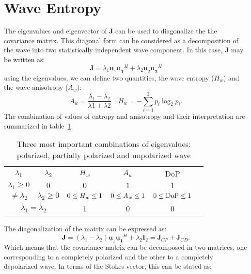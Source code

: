 \documentclass[11pt]{article}
\begin{document}
\section{Wave Entropy}
The eigenvalues and eigenvector of $\mathbf{J}$ can be used to diagonalize the the covariance matrix. This diagonal form can
be considered as a decomposition of the wave into two statistically independent wave component. In this case, $\mathbf{J}$ may be written as:
\begin{equation}
	\mathbf{J} = \lambda_{1}\mathbf{\underline{u}}_{1}\mathbf{\underline{u}_{1}}^{H} + 
				\lambda_{2}\mathbf{\underline{u}}_{2}\mathbf{\underline{u}_{2}}^{H}
\end{equation}
using the eigenvalues, we can define two quantities, the wave entropy ($H_{w}$) and the wave anisotropy  ($A_{w}$):
\begin{equation}
	A_{w} = \frac{\lambda_{1} - \lambda_{2}}{\lambda{1} + \lambda{2}}\quad H_{w} = -\sum_{i=1}^{2}p_{i}\log_{2}{p_{i}}.
\end{equation}
The combination of values of entropy and anisotropy and their interpretation are summarized in table~\ref{tb:entropyW}.
\begin{table}[b]
	\centering
	\begin{tabular}{cccccc}
		\hline
		$\lambda_{1}$ & $\lambda_{2}$ & $H_{w}$ & $A_{w}$ & DoP\\
		$\lambda_{1} \geq 0$ & $0$ & $0$ & $1$ & $1$\\
		$\neq \lambda_{2}$ & $\lambda_{2}\geq 0$ & $0 \leq H_{w} \leq 1$ & $0 \leq A_{w} \leq 1$ & $0 \leq \mathrm{DoP} \leq 1$	\\
		\multicolumn{2}{c}{$\lambda_{1} = \lambda_{2}$} & 1 & 0 & 0\\
		\hline
	\end{tabular}
	\caption{Three most important combinations of eigenvalues: polarized, partially polarized and unpolarized wave}
	\label{tb:entropyW}
\end{table}
The diagonalization of the matrix can be expressed as:
\begin{equation}
	\mathbf{J} = \left(\lambda_{1} - \lambda_{2}\right)\mathbf{\underline{u}}_{1}\mathbf{\underline{u}_{1}}^{H} + 
				\lambda_{2}\mathbf{I}_{2} = \mathbf{J}_{CP} + \mathbf{J}_{CD}.
\end{equation}
Which means that the covariance matrix can be decomposed in two matrices, one corresponding to a completely polarized and the other to a completely depolarized wave. In terms of the Stokes vector, this can be stated as:
\end{document}
